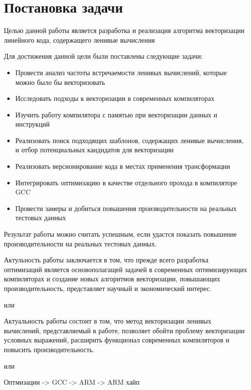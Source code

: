 \section{Постановка задачи}
\label{sec:Chapter1} 


Целью данной работы является разработка и реализация алгоритма векторизации линейного кода, содержащего ленивые вычисления

Для достижения данной цели были поставлены следующие задачи:

\begin{itemize}
    \item Провести анализ частоты встречаемости ленивых вычислений, которые можно было бы векторизовать
    \item Исследовать подходы к векторизации в современных компиляторах
    \item Изучить работу компилятора с памятью при векторизации данных и инструкций
    \item Реализовать поиск подходящих шаблонов, содержащих ленивые вычисления, и отбор потенциальных кандидатов для векторизации
    \item Реализовать версионирование кода в местах применения трансформации
    \item Интегрировать оптимизацию в качестве отдельного прохода в компиляторе GCC
    \item Провести замеры и добиться повышения производительности на реальных тестовых данных
\end{itemize}

Результат работы можно считать успешным, если удастся показать повышение производительности на реальных тестовых данных. 

\todo[решить]

Актульность работы заключается в том, что прежде всего разработка оптимизаций является основополагащей задачей в современных оптимизирующих компиляторах и создание новых алгоритмов векторизации, повышающих производительность, представляет научный и экономический интерес. 

или 

Актуальность работы состоит в том, что метод векторизации ленивых вычислений, представляемый в работе, позволяет обойти проблему векторизации условных выражений, расширить функционал современных компиляторов и повысить производительность.

или 

Оптмизации -> GCC -> ARM -> ARM хайп

\newpage
